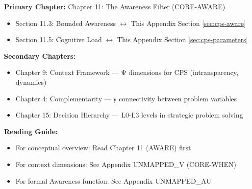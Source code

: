\begin{tcolorbox}[colback=purple!5!white, colframe=purple!75!black,
    title=Chapter Linkage]

\textbf{Primary Chapter:} Chapter 11: The Awareness Filter (CORE-AWARE)
\begin{itemize}[nosep]
\item Section 11.3: Bounded Awareness $\leftrightarrow$ This Appendix Section \ref{sec:cps-aware}
\item Section 11.5: Cognitive Load $\leftrightarrow$ This Appendix Section \ref{sec:cps-parameters}
\end{itemize}

\textbf{Secondary Chapters:}
\begin{itemize}[nosep]
\item Chapter 9: Context Framework --- Ψ dimensions for CPS (intransparency, dynamics)
\item Chapter 4: Complementarity --- γ connectivity between problem variables
\item Chapter 15: Decision Hierarchy --- L0-L3 levels in strategic problem solving
\end{itemize}

\textbf{Reading Guide:}
\begin{itemize}[nosep]
\item For conceptual overview: Read Chapter 11 (AWARE) first
\item For context dimensions: See Appendix UNMAPPED_V (CORE-WHEN)
\item For formal Awareness function: See Appendix UNMAPPED_AU
\end{itemize}

\end{tcolorbox}


\begin{abstract}
Complex Problem Solving (CPS) is a well-established research paradigm originating from Dörner's work on the ``Logic of Failure'' and operationalized through Funke's MicroDYN approach. This appendix demonstrates that CPS is not a separate theory in the EBF but rather a specific \textbf{configuration of 6 existing CORE dimensions}: AWARE, HOW, WHEN, READY, STAGE, and WHAT. We provide the core formula $U_{\text{CPS}}(t) = A(\Psi_{\text{load}}) \times (1-\eta) \times [U_D + \sum \gamma_{ij} \times (\frac{dX_i}{dt} \times \frac{dX_j}{dt})]$, validate parameters from the CPS literature, and derive intervention priorities based on sensitivity analysis showing intransparency (η) as the primary lever (42\%).
\end{abstract}

